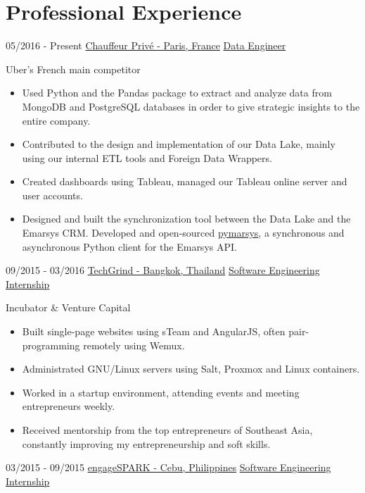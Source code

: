 \documentclass[]{friggeri-cv}
\begin{document}
\section{Professional Experience}
\begin{entrylist}
  \entry
    {05/2016 - Present}
    {\href{https://chauffeur-prive.com}{Chauffeur Privé - Paris, France}}
    {\href{https://chauffeur-prive.com}{Data Engineer}}
    {Uber's French main competitor\\
      \begin{itemize}
        \item Used Python and the Pandas package to extract and analyze data from MongoDB and PostgreSQL databases in order to give strategic insights to the entire company.  
        \item Contributed to the design and implementation of our Data Lake, mainly using our internal ETL tools and Foreign Data Wrappers. 
        \item Created dashboards using Tableau, managed our Tableau online server and user accounts.
        \item Designed and built the synchronization tool between the Data Lake and the Emarsys CRM. Developed and open-sourced \href{https://github.com/transcovo/pymarsy}{pymarsys}, a synchronous and asynchronous Python client for the Emarsys API. 
      \end{itemize}
    }
  \entry
    {09/2015 - 03/2016}
    {\href{http://techgrind.asia/}{TechGrind - Bangkok, Thailand}}
    {\href{http://techgrind.asia/}{Software Engineering Internship}}
    {Incubator \& Venture Capital \\
      \begin{itemize}
        \item Built single-page websites using sTeam and AngularJS, often pair-programming remotely using Wemux. 
        \item Administrated GNU/Linux servers using Salt, Proxmox and Linux containers. 
        \item Worked in a startup environment, attending events and meeting entrepreneurs weekly.
        \item Received mentorship from the top entrepreneurs of Southeast Asia, constantly improving my entrepreneurship and soft skills.
      \end{itemize}
    }  
  \entry
    {03/2015 - 09/2015}
    {\href{https://www.engagespark.com/}{engageSPARK - Cebu, Philippines}}
    {\href{https://www.engagespark.com/}{Software Engineering Internship}}

\end{entrylist}
\end{document}
